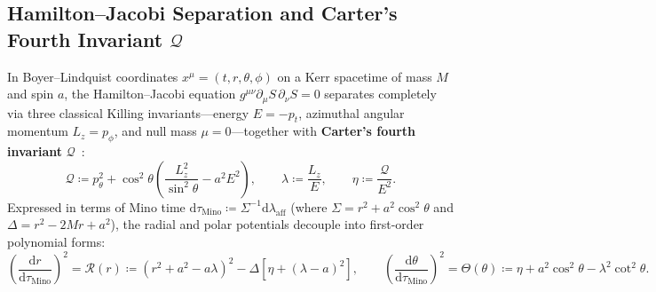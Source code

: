 \documentclass[11pt,a4paper,reqno]{article}
\theoremstyle{plain}
\theoremstyle{definition}
\theoremstyle{remark}
\numberwithin{equation}{section}
\begin{document}
\subsection{Hamilton--Jacobi Separation and Carter's Fourth Invariant \texorpdfstring{$\mathcal{Q}$}{Q}}
In Boyer--Lindquist coordinates $x^\mu = (t, r, \theta, \phi)$ on a Kerr spacetime of mass $M$ and spin $a$, the Hamilton--Jacobi equation $g^{\mu\nu}\partial_\mu S\,\partial_\nu S = 0$ separates completely via three classical Killing invariants—energy $E = -p_t$, azimuthal angular momentum $L_z = p_\phi$, and null mass $\mu = 0$—together with \textbf{Carter's fourth invariant} $\mathcal{Q}$~\cite{Carter1968}:
\begin{equation}
\mathcal{Q} \coloneqq p_\theta^2 + \cos^2\theta\!\left(\frac{L_z^2}{\sin^2\theta} - a^2 E^2\right), \qquad
\lambda \coloneqq \frac{L_z}{E}, \qquad
\eta \coloneqq \frac{\mathcal{Q}}{E^2}.
\label{eq:carter_constant}
\end{equation}
Expressed in terms of Mino time $\mathrm{d}\tau_{\mathrm{Mino}} \coloneqq \Sigma^{-1}\mathrm{d}\lambda_{\mathrm{aff}}$ (where $\Sigma = r^2 + a^2\cos^2\theta$ and $\Delta = r^2 - 2Mr + a^2$), the radial and polar potentials decouple into first-order polynomial forms:
\begin{equation}
\left(\frac{\mathrm{d}r}{\mathrm{d}\tau_{\mathrm{Mino}}}\right)^2 = \mathcal{R}(r) \coloneqq \left(r^2 + a^2 - a\lambda\right)^2 - \Delta\left[\eta + (\lambda - a)^2\right], \qquad
\left(\frac{\mathrm{d}\theta}{\mathrm{d}\tau_{\mathrm{Mino}}}\right)^2 = \Theta(\theta) \coloneqq \eta + a^2\cos^2\theta - \lambda^2\cot^2\theta.
\label{eq:mino_potentials}
\end{equation}
\end{document}
